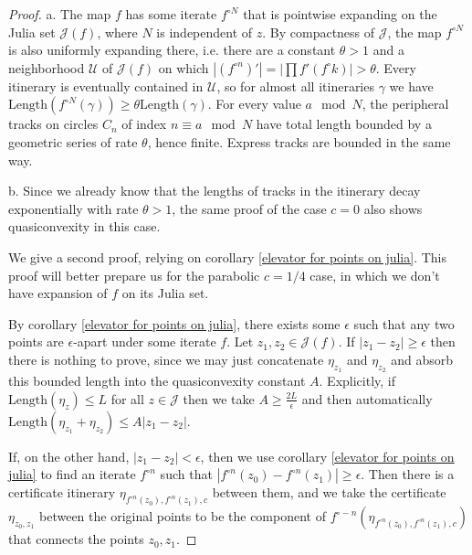 \begin{proof}
a. The map $f$ has some iterate $f^{\circ N}$ that is pointwise expanding on the Julia set $\mathcal{J}(f)$, where $N$ is independent of $z$.
By compactness of $\mathcal J$, the map $f^{\circ N}$ is also uniformly expanding there, i.e. there are a constant $\theta>1$ and a neighborhood $\mathcal{U}$ of $\mathcal{J}(f)$ on which $\left|(f^{\circ n})'\right|=|\prod f'(f^\circ k) |>\theta$. Every itinerary is eventually contained in $\mathcal{U}$, so for almost all itineraries $\gamma$ we have $\mathrm{Length} \left( f^{\circ N}(\gamma) \right) \geq \theta \mathrm{Length} \left( \gamma \right)$. 
For every value $a \mod N$, the peripheral tracks on circles $C_n$ of index $n \equiv a \mod N$ have total length bounded by a geometric series of rate $\theta$, hence finite. Express tracks are bounded in the same way. %

b.
 Since we already know that the lengths of tracks in the itinerary decay exponentially with rate $\theta>1$, the same proof of the case $c=0$ also shows quasiconvexity in this case.

We give a second proof, relying on corollary \ref{elevator for points on julia}. This proof will better prepare us for the
parabolic $c=1/4$ case, in which we don't have expansion of $f$ on its Julia set.

By corollary \ref{elevator for points on julia}, there exists some $\epsilon$ such that any two points are $\epsilon$-apart under some iterate $f$. 
Let $z_{1},z_{2}\in\mathcal{J}(f)$. If $\left|z_{1}-z_{2}\right|\geq\epsilon$ then there is nothing to
prove, since we may just concatenate $\eta_{z_{1}}$ and $\eta_{z_{2}}$
and absorb this bounded length into the quasiconvexity constant
$A$. Explicitly, if $\mathrm{Length}\left(\eta_{z}\right)\leq L$
for all $z\in\mathcal{J}$ then we take $A\geq\frac{2L}{\epsilon}$
and then automatically $\mathrm{Length}\left(\eta_{z_{1}}+\eta_{z_{2}}\right)\leq A\left|z_{1}-z_{2}\right|$.

If, on the other hand, $\left|z_{1}-z_{2}\right|<\epsilon$, then
we use  corollary \ref{elevator for points on julia} to find an iterate $f^{\circ n}$ such that $\left|f^{\circ n}(z_{0})-f^{\circ n}(z_{1})\right|\geq\epsilon$.
Then there is a certificate itinerary $\eta_{f^{\circ n}(z_{0}),f^{\circ n}(z_{1}),c}$
between them, and we take the certificate $\eta_{z_{0},z_{1}}$ between
the original points to be the component of $f^{\circ-n}\left(\eta_{f^{\circ n}(z_{0}),f^{\circ n}(z_{1}),c}\right)$
that connects the points $z_{0},z_{1}$.


\end{proof}

